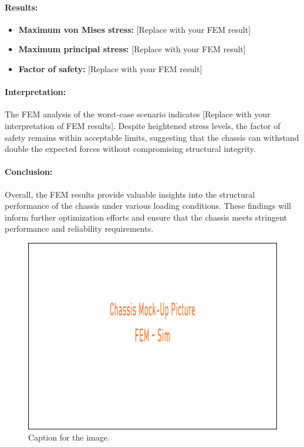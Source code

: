 \paragraph{Results:}
\begin{itemize}
    \item\textbf{Maximum von Mises stress:} [Replace with your FEM result]
    \item\textbf{Maximum principal stress:} [Replace with your FEM result]
    \item\textbf{Factor of safety:} [Replace with your FEM result]
\end{itemize}

\paragraph{Interpretation: }
The FEM analysis of the worst-case scenario indicates [Replace with your interpretation of FEM results]. Despite heightened stress levels, the factor of safety remains within acceptable limits, suggesting that the chassis can withstand double the expected forces without compromising structural integrity.

\paragraph{Conclusion:}
Overall, the FEM results provide valuable insights into the structural performance of the chassis under various loading conditions. These findings will inform further optimization efforts and ensure that the chassis meets stringent performance and reliability requirements.

\begin{figure}[ht]
  \centering
  \includegraphics[width=\linewidth]{texfiles/mech/updated/chassis/fem1.png}
  \caption{Caption for the image.}
  \label{fig:image1}
\end{figure}

